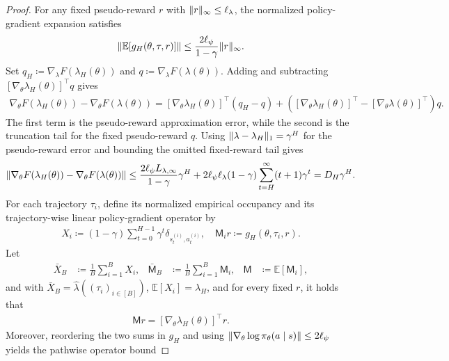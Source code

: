\documentclass{article}
\theoremstyle{plain}
\theoremstyle{definition}
\theoremstyle{remark}
\newcommand{\Exp}[1]{{ \mathbb{E}}\!\left[#1\right]}
\DeclarePairedDelimiter{\norm}{\lVert}{\rVert}
\newcommand{\define}{\coloneqq}
\def\lambdaHat{{\widehat{\lambda}}}
\def\ss{{s}}
\newcommand{\setm}[1]{[#1]}
\def\aa{{a}}
\def\ss{{s}}
\def\rew{{r}}
\begin{document}
\begin{proof}
 For any fixed pseudo-reward $\rew$ with
 $\norm{\rew}_\infty\leq\ell_\lambda$, the normalized policy-gradient
 expansion satisfies
 \begin{align*}
  \norm*{\Exp{g_H(\theta,\tau,\rew)}}
  \leq\frac{2\ell_\psi}{1-\gamma}\norm{\rew}_\infty.
 \end{align*}
 Set $q_H\define\nabla_\lambda F(\lambda_H(\theta))$ and
 $q\define\nabla_\lambda F(\lambda(\theta))$. Adding and subtracting
 $[\nabla_\theta\lambda_H(\theta)]^\top q$ gives
 \begin{align*}
  \nabla_\theta F(\lambda_H(\theta))-\nabla_\theta F(\lambda(\theta))
  =[\nabla_\theta\lambda_H(\theta)]^\top(q_H-q)
  +\left([\nabla_\theta\lambda_H(\theta)]^\top
  -[\nabla_\theta\lambda(\theta)]^\top\right)q.
 \end{align*}
 The first term is the pseudo-reward approximation error, while the second
 is the truncation tail for the fixed pseudo-reward $q$.
 Using $\norm{\lambda-\lambda_H}_1=\gamma^H$ for the pseudo-reward
 error and bounding the omitted fixed-reward tail gives
 \begin{align*}
  \norm*{\nabla_\theta F(\lambda_H(\theta))
   -\nabla_\theta F(\lambda(\theta))}
  \leq\frac{2\ell_\psi L_{\lambda,\infty}}{1-\gamma}\gamma^H
  +2\ell_\psi\ell_\lambda(1-\gamma)
  \sum_{t=H}^{\infty}(t+1)\gamma^t
  =D_H\gamma^H.
 \end{align*}
 For each trajectory $\tau_i$, define its normalized empirical occupancy
 and its trajectory-wise linear policy-gradient operator by
 \begin{align*}
  X_i\define(1-\gamma)\sum_{t=0}^{H-1}\gamma^t
  \delta_{\ss_t^{(i)},\aa_t^{(i)}},\quad
  \mathsf M_i\rew\define g_H(\theta,\tau_i,\rew).
 \end{align*}
 Let
 \begin{align*}
  \bar X_B & \define\frac1B\sum_{i=1}^B X_i,
           & \bar{\mathsf M}_B               & \define\frac1B\sum_{i=1}^B\mathsf M_i,
           & \mathsf M                       & \define\Exp{\mathsf M_i},
 \end{align*}
 and with $\bar X_B=\lambdaHat((\tau_i)_{i\in\setm{B}})$,
 $\Exp{X_i}=\lambda_H$, and for every fixed $\rew$, it holds that
 \begin{align*}
  \mathsf M\rew=[\nabla_\theta\lambda_H(\theta)]^\top\rew.
 \end{align*}
 Moreover, reordering the two sums in $g_H$ and using
 $\norm{\nabla_\theta\log\pi_\theta(\aa\mid\ss)}\leq2\ell_\psi$
 yields the pathwise operator bound

\end{proof}
\end{document}
